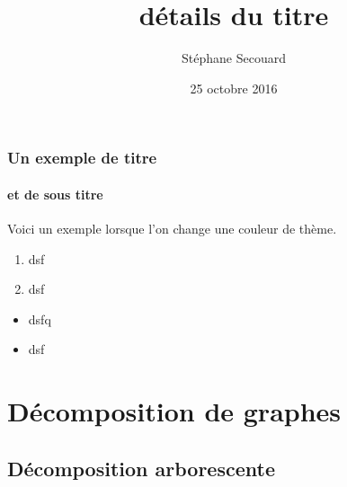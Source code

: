\documentclass[8pt]{beamer}
\title[Le titre]{détails du titre}
\author{Stéphane Secouard}
\institute{M2 E-Secure}
\date{25 octobre 2016}
\begin{document}
\begin{frame}
  \titlepage
\end{frame}

\begin{frame}

  \tableofcontents

\end{frame}





\begin{frame}

  \tableofcontents[currentsection]

\end{frame}


\begin{frame}
  \frametitle{Un exemple de titre}
  
  \framesubtitle{et de sous titre}

Voici un exemple lorsque l'on change une couleur de thème.

\begin{enumerate}
\item dsf
\item dsf
\end{enumerate}
\begin{itemize}
\item dsfq
\item dsf
\end{itemize}

\end{frame}



\section{Décomposition de graphes}
\subsection{Décomposition arborescente}
\end{document}
